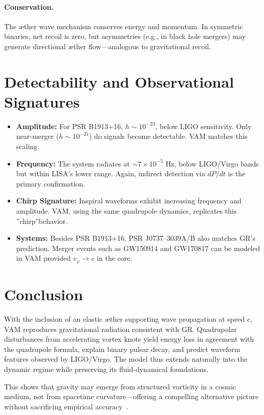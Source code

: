 \documentclass[a4paper, aps,preprint,superscriptaddress, 12pt]{revtex4}
\providecommand{\grqq}{\textquotedblright}
\begin{document}
\paragraph{Conservation.}
The æther wave mechanism conserves energy and momentum. In symmetric binaries, net recoil is zero, but asymmetries (e.g., in black hole mergers) may generate directional æther flow—analogous to gravitational recoil.

\section*{Detectability and Observational Signatures}

\begin{itemize}
\item \textbf{Amplitude:} For PSR B1913+16, $h \sim 10^{-23}$, below LIGO sensitivity. Only near-merger ($h \sim 10^{-21}$) do signals become detectable. VAM matches this scaling.
\item \textbf{Frequency:} The system radiates at $\sim 7 \times 10^{-5}$ Hz, below LIGO/Virgo bands but within LISA's lower range. Again, indirect detection via $dP/dt$ is the primary confirmation.
\item \textbf{Chirp Signature:} Inspiral waveforms exhibit increasing frequency and amplitude. VAM, using the same quadrupole dynamics, replicates this \grqq chirp\textquotedblright behavior.
\item \textbf{Systems:} Besides PSR B1913+16, PSR J0737–3039A/B also matches GR's prediction. Merger events such as GW150914 and GW170817 can be modeled in VAM provided $v_\varphi \rightarrow c$ in the core.
\end{itemize}

\section*{Conclusion}

With the inclusion of an elastic æther supporting wave propagation at speed $c$, VAM reproduces gravitational radiation consistent with GR. Quadrupolar disturbances from accelerating vortex knots yield energy loss in agreement with the quadrupole formula, explain binary pulsar decay, and predict waveform features observed by LIGO/Virgo. The model thus extends naturally into the dynamic regime while preserving its fluid-dynamical foundations.

This shows that gravity may emerge from structured vorticity in a cosmic medium, not from spacetime curvature—offering a compelling alternative picture without sacrificing empirical accuracy~\cite{iskandarani2025VAM3}.
\end{document}
